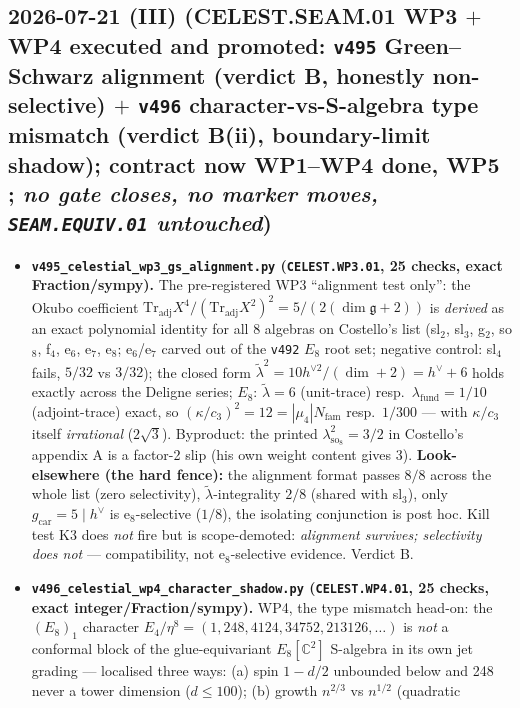 \subsection*{2026-07-21 (III) (CELEST.SEAM.01 WP3 $+$ WP4 executed and promoted: \texttt{v495} Green--Schwarz alignment (verdict B, honestly non-selective) $+$ \texttt{v496} character-vs-S-algebra type mismatch (verdict B(ii), boundary-limit shadow); contract now WP1--WP4 done, WP5 \mO; \emph{no gate closes, no marker moves, \texttt{SEAM.EQUIV.01} untouched})}
\begin{itemize}[leftmargin=1.5em]
\item \textbf{\texttt{v495\_celestial\_wp3\_gs\_alignment.py} (\texttt{CELEST.WP3.01}, 25 checks, exact
Fraction/sympy).} The pre-registered WP3 ``alignment test only'': the Okubo coefficient
$\mathrm{Tr}_{\mathrm{adj}}X^4/(\mathrm{Tr}_{\mathrm{adj}}X^2)^2=5/(2(\dim\mathfrak g{+}2))$ is
\emph{derived} as an exact polynomial identity for all 8 algebras on Costello's list (sl$_2$, sl$_3$,
g$_2$, so$_8$, f$_4$, e$_6$, e$_7$, e$_8$; e$_6$/e$_7$ carved out of the \texttt{v492} $E_8$ root set;
negative control: sl$_4$ fails, $5/32$ vs $3/32$); the closed form
$\tilde\lambda^2=10h^{\vee2}/(\dim{+}2)=h^\vee{+}6$ holds exactly across the Deligne series; $E_8$:
$\tilde\lambda=6$ (unit-trace) resp.\ $\lambda_{\mathrm{fund}}=1/10$ (adjoint-trace) exact, so
$(\kappa/c_3)^2=12=|\mu_4|N_{\mathrm{fam}}$ resp.\ $1/300$ --- with $\kappa/c_3$ itself
\emph{irrational} ($2\sqrt3$). Byproduct: the printed $\lambda^2_{\mathrm{so}_8}=3/2$ in Costello's
appendix A is a factor-2 slip (his own weight content gives 3). \textbf{Look-elsewhere (the hard
fence):} the alignment format passes $8/8$ across the whole list (zero selectivity),
$\tilde\lambda$-integrality $2/8$ (shared with sl$_3$), only $g_{\mathrm{car}}{=}5\mid h^\vee$ is
e$_8$-selective ($1/8$), the isolating conjunction is post hoc. Kill test K3 does \emph{not} fire but is
scope-demoted: \emph{alignment survives; selectivity does not} --- compatibility, not e$_8$-selective
evidence. Verdict B.
\item \textbf{\texttt{v496\_celestial\_wp4\_character\_shadow.py} (\texttt{CELEST.WP4.01}, 25 checks,
exact integer/Fraction/sympy).} WP4, the type mismatch head-on: the $(E_8)_1$ character
$E_4/\eta^8=(1,248,4124,34752,213126,\dots)$ is \emph{not} a conformal block of the glue-equivariant
$E_8[\mathbb C^2]$ S-algebra in its own jet grading --- localised three ways: (a) spin $1-d/2$ unbounded
below and 248 never a tower dimension ($d\le100$); (b) growth $n^{2/3}$ vs $n^{1/2}$ (quadratic

\end{itemize}
